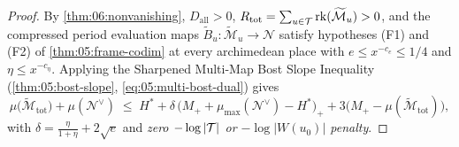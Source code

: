 \begin{proof}
By \cref{thm:06:nonvanishing}, $D_{\mathrm{all}} > 0$, $R_{\mathrm{tot}} = \sum_{u \in \mathcal{T}} \operatorname{rk}(\widetilde{\mathcal{M}}_u) > 0$, and the compressed period evaluation maps $\widetilde{B}_u : \widetilde{\mathcal{M}}_u \to \mathcal{N}$ satisfy hypotheses (F1) and (F2) of \cref{thm:05:frame-codim} at every archimedean place with $e \le x^{-c_e} \le 1/4$ and $\eta \le x^{-c_\eta}$. Applying the Sharpened Multi-Map Bost Slope Inequality (\cref{thm:05:bost-slope}, \eqref{eq:05:multi-bost-dual}) gives
\begin{equation}
\label{eq:06:sandwich-raw}
  \mu\bigl(\widetilde{\mathcal{M}}_{\mathrm{tot}}\bigr) + \mu(\mathcal{N}^\vee)
  \;\le\; H^* + \delta\,\bigl(M_+ + \mu_{\max}(\mathcal{N}^\vee) - H^*\bigr)_+
  + 3\bigl(M_+ - \mu(\widetilde{\mathcal{M}}_{\mathrm{tot}})\bigr),
\end{equation}
with $\delta = \frac{\eta}{1+\eta} + 2\sqrt{e}$ and \emph{zero $-\log|\mathcal{T}|$ or $-\log|W(u_0)|$ penalty}.


\end{proof}
